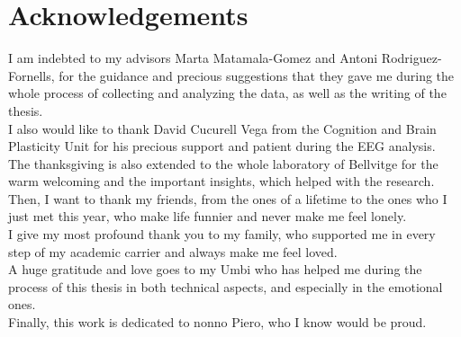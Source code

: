 \chapter*{Acknowledgements}
I am indebted to my advisors Marta Matamala-Gomez and Antoni Rodriguez-Fornells, for the guidance and precious suggestions that they gave me during the whole process of collecting and analyzing the data, as well as the writing of the thesis. \\
I also would like to thank David Cucurell Vega from the Cognition and Brain Plasticity Unit for his precious support and patient during the EEG analysis. \\
The thanksgiving is also extended to the whole laboratory of Bellvitge for the warm welcoming and the important insights, which helped with the research. \\
Then, I want to thank my friends, from the ones of a lifetime to the ones who I just met this year, who make life funnier and never make me feel lonely. \\
I give my most profound thank you to my family, who supported me in every step of my academic carrier and always make me feel loved. \\ A huge gratitude and love goes to my Umbi who has helped me during the process of this thesis in both technical aspects, and especially in the emotional ones. \\
Finally, this work is dedicated to nonno Piero, who I know would be proud.